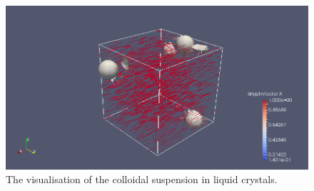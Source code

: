 \documentclass[11pt,twoside,a4paper]{article}
\begin{document}
\begin{enumerate}
\begin{enumerate}
\begin{figure}[H]
\begin{center}
\includegraphics[width=0.6\linewidth]{colloidSystem.png}
  \caption{The visualisation of the colloidal suspension in liquid crystals.}
  \label{fig:collVis}
  \end{center}
\end{figure}


\end{enumerate}
\end{enumerate}

%
\end{document}
